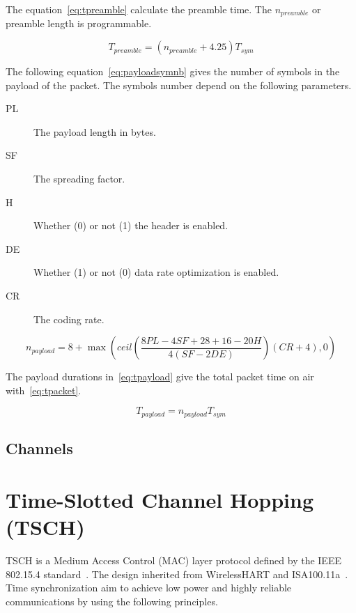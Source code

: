 The equation~\ref{eq:tpreamble} calculate the preamble time. The $n_{preamble}$
or preamble length is programmable.

\begin{equation}
  \label{eq:tpreamble}
  T_{preamble} = (n_{preamble} + 4.25)T_{sym}
\end{equation}

The following equation~\ref{eq:payloadsymnb} gives the number of symbols in the
payload of the packet.
The symbols number depend on the following parameters.

\begin{description}
  \item[PL] The payload length in bytes.
  \item[SF] The spreading factor.
  \item[H] Whether (0) or not (1) the header is enabled.
  \item[DE] Whether (1) or not (0) data rate optimization is enabled.
  \item[CR] The coding rate.
\end{description}

\begin{equation}
  \label{eq:payloadsymnb}
  n_{payload} = 8 + \max(ceil(\frac{8PL - 4SF + 28 + 16 - 20H}{4(SF - 2DE)})(CR + 4),0)
\end{equation}

The payload durations in~\ref{eq:tpayload} give the total packet time on air
with~\ref{eq:tpacket}.

\begin{equation}
  \label{eq:tpayload}
  T_{payload} = n_{payload} T_{sym}
\end{equation}


\subsection{Channels}


\section{Time-Slotted Channel Hopping (TSCH)}

TSCH is a Medium Access Control (MAC) layer protocol defined by the IEEE
802.15.4 standard~\cite{rfc7554}.
The design inherited from WirelessHART and
ISA100.11a~\cite{Duquennoy2017TSCHA6}.
Time synchronization aim to achieve low power and highly reliable
communications by using the following principles.

